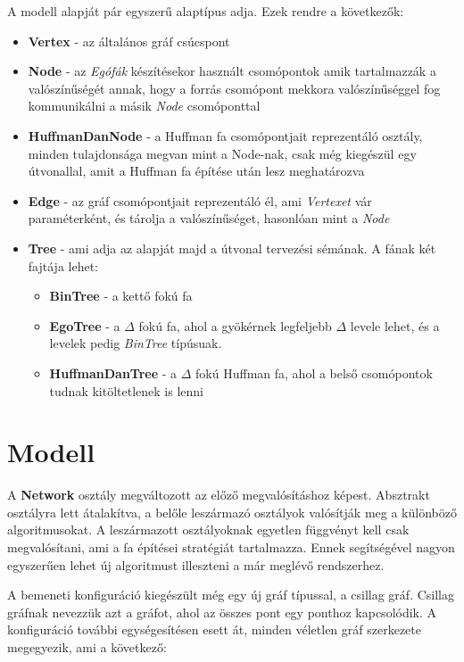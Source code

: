 \documentclass[12pt]{report}
\begin{document}
A modell alapját pár egyszerű alaptípus adja. Ezek rendre a következők:
\begin{itemize}
	\item \textbf{Vertex} - az általános gráf csúcspont
	\item \textbf{Node} - az \textit{Egófák} készítésekor használt csomópontok amik tartalmazzák a valószínűségét annak, hogy a forrás csomópont mekkora valószínűséggel fog kommunikálni a másik \textit{Node} csomóponttal
	\item \textbf{HuffmanDanNode} - a Huffman fa csomópontjait reprezentáló osztály, minden tulajdonsága megvan mint a Node-nak, csak még kiegészül egy útvonallal, amit a Huffman fa építése után lesz meghatározva
	\item \textbf{Edge} - az gráf csomópontjait reprezentáló él, ami \textit{Vertexet} vár paraméterként, és tárolja a valószínűséget, hasonlóan mint a \textit{Node}
	\item \textbf{Tree} - ami adja az alapját majd a útvonal tervezési sémának. A fának két fajtája lehet:
	\begin{itemize}
		\item \textbf{BinTree} - a kettő fokú fa
		\item \textbf{EgoTree} - a $\Delta$ fokú fa, ahol a gyökérnek legfeljebb $\Delta$ levele lehet, és a levelek pedig \textit{BinTree} típúsuak.
		\item \textbf{HuffmanDanTree} - a $\Delta$ fokú Huffman fa, ahol a belső csomópontok tudnak kitöltetlenek is lenni
	\end{itemize}

	
\end{itemize}
	
\section{Modell}

A \textbf{Network} osztály megváltozott az előző megvalósításhoz képest.
Absztrakt osztályra lett átalakítva, a belőle leszármazó osztályok valósítják meg a különböző algoritmusokat.
A leszármazott osztályoknak egyetlen függvényt kell csak megvalósítani, ami a fa építései stratégiát tartalmazza.
Ennek segítségével nagyon egyszerűen lehet új algoritmust illeszteni a már meglévő rendszerhez.

A bemeneti konfiguráció kiegészült még egy új gráf típussal, a csillag gráf.
Csillag gráfnak nevezzük azt a gráfot, ahol az összes pont egy ponthoz kapcsolódik.
A konfiguráció további egységesítésen esett át, minden véletlen gráf szerkezete megegyezik, ami a következő:
\end{document}
